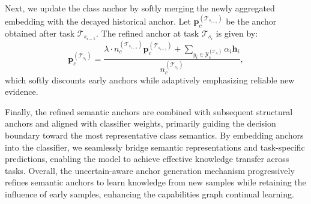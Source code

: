 \documentclass[sigconf]{acmart}
\begin{document}
Next, we update the class anchor by softly merging the newly aggregated embedding with the decayed historical anchor. 
Let $\mathbf{p}_c^{(\mathcal{T}_{s_{i-1}})}$ be the anchor obtained after task $\mathcal{T}_{s_{i-1}}$. The refined anchor at task $\mathcal{T}_{s_i}$ is given by:
\begin{equation}
\mathbf{p}_c^{(\mathcal{T}_{s_i})} = \frac{\lambda \cdot n_c^{(\mathcal{T}_{s_{i-1}})} \mathbf{p}_c^{(\mathcal{T}_{s_{i-1}})} + \sum_{y_i \in \mathcal{Y}_c^{(\mathcal{T}_{s_i})}} \alpha_i \mathbf{h}_i}{n_c^{(\mathcal{T}_{s_i})}},
\end{equation}
which softly discounts early anchors while adaptively emphasizing reliable new evidence.  

Finally, the refined semantic anchors are combined with subsequent structural anchors and aligned with classifier weights, primarily guiding the decision boundary toward the most representative class semantics.
By embedding anchors into the classifier, we seamlessly bridge semantic representations and task-specific predictions, enabling the model to achieve effective knowledge transfer across tasks.
Overall, the uncertain-aware anchor generation mechanism progressively refines semantic anchors to learn knowledge from new samples while retaining the influence of early samples, enhancing the capabilities graph continual learning.
\end{document}
